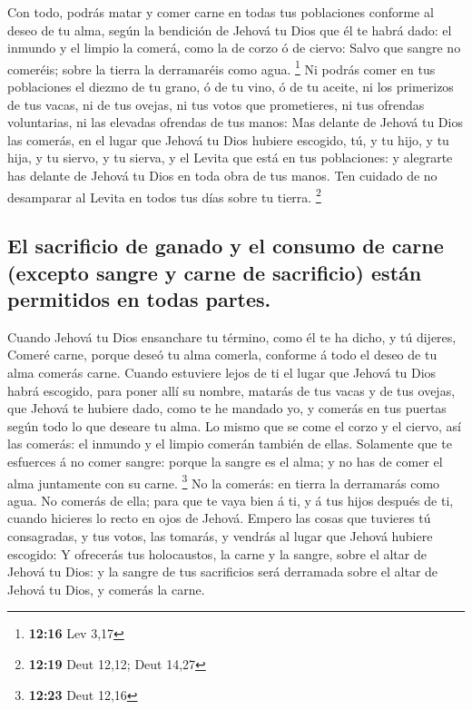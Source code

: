  Con todo, podrás matar y comer carne en todas tus
poblaciones conforme al deseo de tu alma, según la bendición de Jehová
tu Dios que él te habrá dado: el inmundo y el limpio la comerá, como la
de corzo ó de ciervo:  Salvo que sangre no comeréis; sobre
la tierra la derramaréis como agua. \footnote{\textbf{12:16} Lev 3,17}
 Ni podrás comer en tus poblaciones el diezmo de tu grano,
ó de tu vino, ó de tu aceite, ni los primerizos de tus vacas, ni de tus
ovejas, ni tus votos que prometieres, ni tus ofrendas voluntarias, ni
las elevadas ofrendas de tus manos:  Mas delante de Jehová
tu Dios las comerás, en el lugar que Jehová tu Dios hubiere escogido,
tú, y tu hijo, y tu hija, y tu siervo, y tu sierva, y el Levita que está
en tus poblaciones: y alegrarte has delante de Jehová tu Dios en toda
obra de tus manos.  Ten cuidado de no desamparar al Levita
en todos tus días sobre tu tierra. \footnote{\textbf{12:19} Deut 12,12;
  Deut 14,27}

\hypertarget{el-sacrificio-de-ganado-y-el-consumo-de-carne-excepto-sangre-y-carne-de-sacrificio-estuxe1n-permitidos-en-todas-partes.}{%
\subsection{El sacrificio de ganado y el consumo de carne (excepto
sangre y carne de sacrificio) están permitidos en todas
partes.}\label{el-sacrificio-de-ganado-y-el-consumo-de-carne-excepto-sangre-y-carne-de-sacrificio-estuxe1n-permitidos-en-todas-partes.}}

 Cuando Jehová tu Dios ensanchare tu término, como él te ha
dicho, y tú dijeres, Comeré carne, porque deseó tu alma comerla,
conforme á todo el deseo de tu alma comerás carne.  Cuando
estuviere lejos de ti el lugar que Jehová tu Dios habrá escogido, para
poner allí su nombre, matarás de tus vacas y de tus ovejas, que Jehová
te hubiere dado, como te he mandado yo, y comerás en tus puertas según
todo lo que deseare tu alma.  Lo mismo que se come el corzo
y el ciervo, así las comerás: el inmundo y el limpio comerán también de
ellas.  Solamente que te esfuerces á no comer sangre:
porque la sangre es el alma; y no has de comer el alma juntamente con su
carne. \footnote{\textbf{12:23} Deut 12,16}  No la comerás:
en tierra la derramarás como agua.  No comerás de ella;
para que te vaya bien á ti, y á tus hijos después de ti, cuando hicieres
lo recto en ojos de Jehová.  Empero las cosas que tuvieres
tú consagradas, y tus votos, las tomarás, y vendrás al lugar que Jehová
hubiere escogido:  Y ofrecerás tus holocaustos, la carne y
la sangre, sobre el altar de Jehová tu Dios: y la sangre de tus
sacrificios será derramada sobre el altar de Jehová tu Dios, y comerás
la carne.

